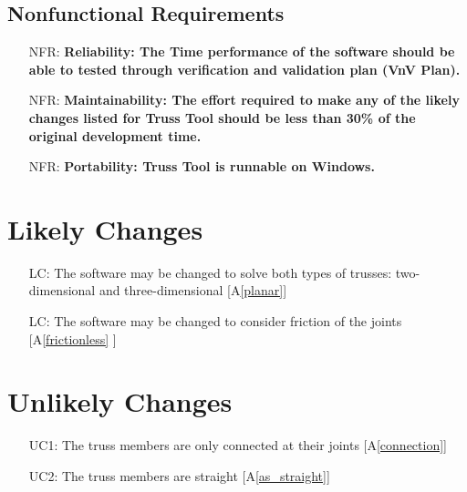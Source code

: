 \documentclass[12pt]{article}
\newcommand{\aref}[1]{A\ref{#1}}
\newcounter{nfrnum} %
\newcounter{lcnum} %
\begin{document}
\subsection{Nonfunctional Requirements}



\noindent \begin{itemize}


 
\item[NFR\refstepcounter{nfrnum}\thenfrnum \label{NFR_Usability}:] \textbf{Reliability: The Time performance of the software should be able to tested through
verification and validation plan (VnV Plan).}
 

\item[NFR\refstepcounter{nfrnum}\thenfrnum \label{NFR_Maintainability}:]
  \textbf{Maintainability: The effort required to make any of the likely    changes listed for Truss Tool should be less than 30\% of the original    development time.}

\item[NFR\refstepcounter{nfrnum}\thenfrnum \label{NFR_Portability}:]
  \textbf{Portability:  Truss Tool is runnable on Windows.}

\end{itemize}

\section{Likely Changes}    

\noindent \begin{itemize}

\item[LC\refstepcounter{lcnum}\thelcnum\label{LC_planar}:] The software may be changed to solve both types of trusses: two-dimensional and three-dimensional [\aref{planar}]  
\item[LC\refstepcounter{lcnum}\thelcnum\label{LC_friction}:] The software may be changed to consider friction of the joints [\aref{frictionless} ]

\end{itemize}

\section{Unlikely Changes}    

\noindent \begin{itemize}

\item[UC1\label{UC_connection}:] The truss members are only connected at their joints [\aref{connection}]
\item[UC2\label{UC_straight}:] The truss members are straight [\aref{as_straight}]
\end{itemize}
\end{document}
